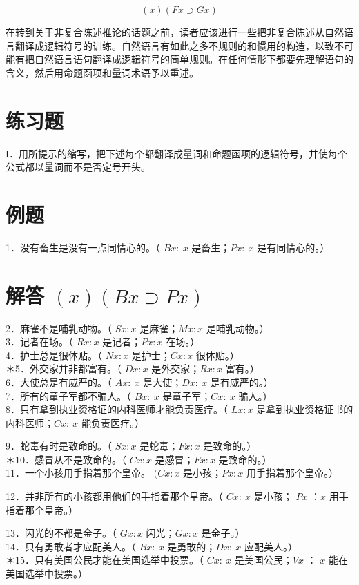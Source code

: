 $$
(x)(F x \supset G x)
$$

在转到关于非复合陈述推论的话题之前，读者应该进行一些把非复合陈述从自然语言翻译成逻辑符号的训练。自然语言有如此之多不规则的和惯用的构造，以致不可能有把自然语言语句翻译成逻辑符号的简单规则。在任何情形下都要先理解语句的含义，然后用命题函项和量词术语予以重述。

\section*{练习题}
I．用所提示的缩写，把下述每个都翻译成量词和命题函项的逻辑符号，并使每个公式都以量词而不是否定号开头。

\section*{例题}
1．没有畜生是没有一点同情心的。（ $B x: ~ x$ 是畜生；$P x: ~ x$ 是有同情心的。）

\section*{解答 $(x)(B x \supset P x)$}
2．麻雀不是哺乳动物。（ $S x: x$ 是麻雀；$M x: x$ 是哺乳动物。）\\
3．记者在场。（ $R x: x$ 是记者；$P x: x$ 在场。）\\
4．护士总是很体贴。（ $N x: x$ 是护士；$C x: x$ 很体贴。）\\
＊5．外交家并非都富有。（ $D x: x$ 是外交家；$R x: x$ 富有。）\\
6．大使总是有威严的。（ $A x: ~ x$ 是大使；$D x: ~ x$ 是有威严的。）\\
7．所有的童子军都不骗人。（ $B x: ~ x$ 是童子军；$C x: ~ x$ 骗人。）\\
8．只有拿到执业资格证的内科医师才能负责医疗。（ $L x: x$ 是拿到执业资格证书的内科医师；$C x: ~ x$ 能负责医疗。）

9．蛇毒有时是致命的。（ $S x: x$ 是蛇毒；$F x: x$ 是致命的。）\\
＊10．感冒从不是致命的。（ $C x: x$ 是感冒；$F x: x$ 是致命的。）\\
11．一个小孩用手指着那个皇帝。 $(C x: x$ 是小孩；$P x: x$ 用手指着那个皇帝。）

12．并非所有的小孩都用他们的手指着那个皇帝。（ $C x: ~ x$ 是小孩； $P x$ ：$x$ 用手指着那个皇帝。）

13．闪光的不都是金子。（ $G x: x$ 闪光；$G x: x$ 是金子。）\\
14．只有勇敢者才应配美人。（ $B x: ~ x$ 是勇敢的；$D x: ~ x$ 应配美人。）\\
＊15．只有美国公民才能在美国选举中投票。（ $C x: ~ x$ 是美国公民；$V x$ ： $x$ 能在美国选举中投票。）

